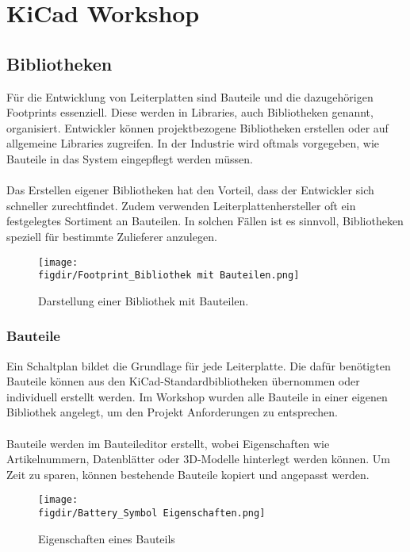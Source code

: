 \section{KiCad Workshop}  

\subsection{Bibliotheken}  
Für die Entwicklung von Leiterplatten sind Bauteile und die dazugehörigen Footprints essenziell.
Diese werden in Libraries, auch Bibliotheken genannt, organisiert. Entwickler können projektbezogene Bibliotheken erstellen oder auf allgemeine Libraries zugreifen.
In der Industrie wird oftmals vorgegeben, wie Bauteile in das System eingepflegt werden müssen.\\  
\\
Das Erstellen eigener Bibliotheken hat den Vorteil, dass der Entwickler sich schneller zurechtfindet.
Zudem verwenden Leiterplattenhersteller oft ein festgelegtes Sortiment an Bauteilen.
In solchen Fällen ist es sinnvoll, Bibliotheken speziell für bestimmte Zulieferer anzulegen.  

\begin{figure}[h]  
    \centering  
    \texttt{[image: \\figdir/Footprint\_Bibliothek mit Bauteilen.png]}  
    \caption{Darstellung einer Bibliothek mit Bauteilen.} 
    \label{fig:Abbildung 5} 
\end{figure}  

\subsubsection{Bauteile}  
Ein Schaltplan bildet die Grundlage für jede Leiterplatte.
Die dafür benötigten Bauteile können aus den KiCad-Standardbibliotheken übernommen oder individuell erstellt werden.
Im Workshop wurden alle Bauteile in einer eigenen Bibliothek angelegt, um den Projekt Anforderungen zu entsprechen.\\
\\
Bauteile werden im Bauteileditor erstellt, wobei Eigenschaften wie Artikelnummern, Datenblätter oder 3D-Modelle hinterlegt werden können.
Um Zeit zu sparen, können bestehende Bauteile kopiert und angepasst werden.  

\begin{figure}[h]  
    \centering  
    \texttt{[image: \\figdir/Battery\_Symbol Eigenschaften.png]}  
    \caption{Eigenschaften eines Bauteils}  
    \label{fig:Abbildung 6}
\end{figure}  

